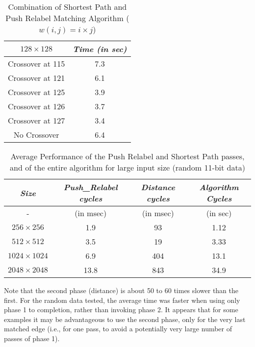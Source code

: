 \begin{table}
\begin{center}
\begin{tabular}{|c|c|} \hline \hline
$128 \times 128$	& {\em Time (in sec)}  \\ \hline
Crossover at 115 	& 7.3 \\ \hline
Crossover at 121 	& 6.1 \\ \hline
Crossover at 125 	& 3.9 \\ \hline
Crossover at 126 	& 3.7 \\ \hline
Crossover at 127 	& 3.4 \\ \hline
No Crossover 		& 6.4 \\ \hline \hline
\end{tabular}
\end{center}
\caption{Combination of Shortest Path and Push Relabel Matching Algorithm
($w(i, j) = i \times j$)}
\label{fig_combine_scale}
\end{table}

\begin{table}
\begin{center}
\begin{tabular}{|c|c|c|c|} \hline \hline
{\em Size }     & {\em Push\_Relabel cycles} & {\em Distance cycles} & {\em Algorithm Cycles} \\ \hline
-      			& (in msec) & (in msec) & (in sec) \\ \hline
$256 \times 256$	&    1.9	& 93 	& 1.12 \\ \hline
$512 \times 512$	&    3.5 	& 19	& 3.33 \\ \hline 
$1024 \times 1024$	&    6.9 	& 404   & 13.1 \\ \hline
$2048 \times 2048$	&   13.8 	& 843	& 34.9 \\ \hline \hline
\end{tabular}
\end{center}
\caption{Average Performance of the Push Relabel and Shortest Path passes,
and of the entire algorithm for large input size (random 11-bit data)}
\label{fig_xxx_scale}
\end{table}

Note that the second phase (distance) is about 50 to 60 times 
slower than the first.  For the random data tested, the average 
time was faster when using only phase 1 to completion, rather than 
invoking phase 2.  It appears that for some examples it may be 
advantageous to use the second phase, only for the very last matched 
edge (i.e., for one pass, to avoid a potentially very large number 
of passes of phase 1).

